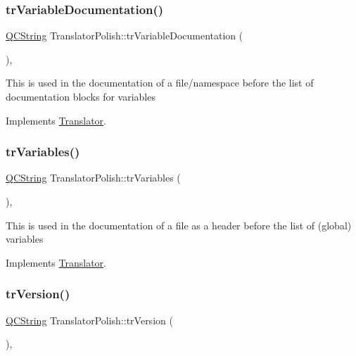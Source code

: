 \subsubsection{\texorpdfstring{trVariableDocumentation()}{trVariableDocumentation()}}
{\footnotesize\ttfamily \mbox{\hyperlink{class_q_c_string}{Q\+C\+String}} Translator\+Polish\+::tr\+Variable\+Documentation (\begin{DoxyParamCaption}{ }\end{DoxyParamCaption})\hspace{0.3cm}{\ttfamily [inline]}, {\ttfamily [virtual]}}

This is used in the documentation of a file/namespace before the list of documentation blocks for variables 

Implements \mbox{\hyperlink{class_translator}{Translator}}.

\mbox{\label{class_translator_polish_a027fd50abf0810dceb10013eb120f949}} 
\subsubsection{\texorpdfstring{trVariables()}{trVariables()}}
{\footnotesize\ttfamily \mbox{\hyperlink{class_q_c_string}{Q\+C\+String}} Translator\+Polish\+::tr\+Variables (\begin{DoxyParamCaption}{ }\end{DoxyParamCaption})\hspace{0.3cm}{\ttfamily [inline]}, {\ttfamily [virtual]}}

This is used in the documentation of a file as a header before the list of (global) variables 

Implements \mbox{\hyperlink{class_translator}{Translator}}.

\mbox{\label{class_translator_polish_a50ad2c9bf96d94a8a21a464b81a4ab3c}} 
\subsubsection{\texorpdfstring{trVersion()}{trVersion()}}
{\footnotesize\ttfamily \mbox{\hyperlink{class_q_c_string}{Q\+C\+String}} Translator\+Polish\+::tr\+Version (\begin{DoxyParamCaption}{ }\end{DoxyParamCaption})\hspace{0.3cm}{\ttfamily [inline]}, {\ttfamily [virtual]}}

